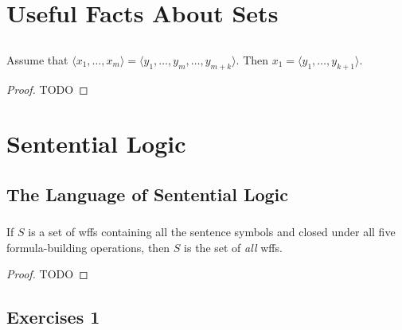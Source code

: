 \documentclass{report}
\begin{document}
\endgroup

\setcounter{chapter}{0}
\addtocounter{chapter}{-1}
\chapter{Useful Facts About Sets}%

\section{}%

  \begin{lemma}[0A]
    Assume that $\langle x_1, \ldots, x_m \rangle =
      \langle y_1, \ldots, y_m, \ldots, y_{m+k} \rangle$.
    Then $x_1 = \langle y_1, \ldots, y_{k+1} \rangle$.
  \end{lemma}

  \begin{proof}
    TODO
  \end{proof}

\chapter{Sentential Logic}%

\section{The Language of Sentential Logic}%

\subsection{}%

  \begin{theorem}
    If $S$ is a set of wffs containing all the sentence symbols and closed under
      all five formula-building operations, then $S$ is the set of \textit{all}
      wffs.
  \end{theorem}

  \begin{proof}
    TODO
  \end{proof}

\section{Exercises 1}%
\end{document}
